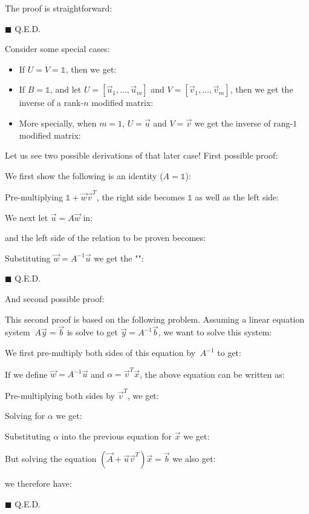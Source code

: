 	The proof is straightforward:
	\begin{dem}
	
	\begin{flushright}
		$\blacksquare$  Q.E.D.
	\end{flushright}
	\end{dem}
	Consider some special cases:
	\begin{itemize}
		\item If ${ U}={ V}={ \mathds{1}}$, then we get:
		
		
		\item If ${ B}={ \mathds{1}}$, and let ${ U}=[{\vec u}_1,\ldots,{\vec u}_m]$ and ${ V}=[{\vec v}_1,\ldots,{\vec v}_m]$, then we get the inverse of a rank-$n$ modified matrix:
		
		
		\item More specially, when $m=1$, ${ U}={\vec u}$ and ${ V}={\vec v}$ we get the inverse of rang-$1$ modified matrix:
		
	\end{itemize}
	Let us see two possible derivations of that later case! First possible proof:
	\begin{dem}
	We first show the following is an identity ($A=\mathds{1}$):
	
	Pre-multiplying ${ \mathds{1}}+{\vec w}{\vec v}^T$, the right side becomes ${ \mathds{1}}$ as well as the left side:
	
	We next let ${\vec u}={ A\vec w}$ in:
	
	and the left side of the relation to be proven becomes:
	
	Substituting $\vec{w}={A}^{-1}{\vec u}$ we get the "\label{Sherman-Morrison relation}":
	
	\begin{flushright}
		$\blacksquare$  Q.E.D.
	\end{flushright}
	\end{dem}
	And second possible proof:
	\begin{dem}
	This second proof is based on the following problem. Assuming a linear equation system ${\ A}{\vec y}={\vec b}$ is solve to get ${\vec y}={ A}^{-1}{\vec b}$, we want to solve this system:
	
	We first pre-multiply both sides of this equation by ${\ A}^{-1}$ to get:
	
	If we define ${\vec w}={ A}^{-1}{\vec u}$ and $\alpha={\vec v}^T{\vec x}$, the above equation can be written as:
	
	Pre-multiplying both sides by ${\vec v}^T$, we get:
	
	Solving for $\alpha$ we get:
	
	Substituting $\alpha$ into the previous equation for ${\vec x}$ we get:
	
	But solving the equation $({\vec A}+{\vec u}{\vec v}^T){\vec x}={\vec b}$ we also get:
	
	we therefore have:
	
	\begin{flushright}
		$\blacksquare$  Q.E.D.
	\end{flushright}
	\end{dem}
	

